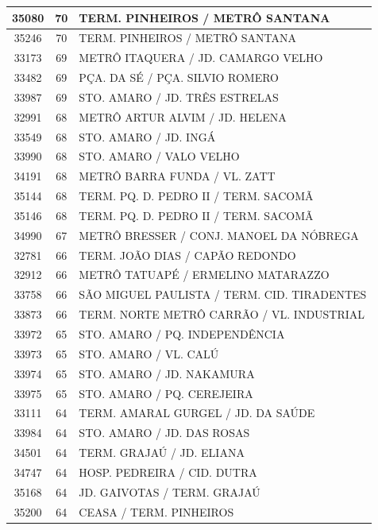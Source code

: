 \documentclass[
	12pt,				%
	oneside,			%
	a4paper,			%
	english,			%
	brazil				%
	]{abntex2ppgsi}
\begin{document}
\begin{apendicesenv}
\begin{longtable}{c|c|p{7cm}}
\hline
    35080 & 70    & TERM. PINHEIROS / METRÔ SANTANA \\
\hline
    35246 & 70    & TERM. PINHEIROS / METRÔ SANTANA \\
\hline
    33173 & 69    & METRÔ ITAQUERA / JD. CAMARGO VELHO \\
\hline
    33482 & 69    & PÇA. DA SÉ / PÇA. SILVIO ROMERO \\
\hline
    33987 & 69    & STO. AMARO / JD. TRÊS ESTRELAS \\
\hline
    32991 & 68    & METRÔ ARTUR ALVIM / JD. HELENA \\
\hline
    33549 & 68    & STO. AMARO / JD. INGÁ \\
\hline
    33990 & 68    & STO. AMARO / VALO VELHO \\
\hline
    34191 & 68    & METRÔ BARRA FUNDA / VL. ZATT \\
\hline
    35144 & 68    & TERM. PQ. D. PEDRO II / TERM. SACOMÃ \\
\hline
    35146 & 68    & TERM. PQ. D. PEDRO II / TERM. SACOMÃ \\
\hline
    34990 & 67    & METRÔ BRESSER / CONJ. MANOEL DA NÓBREGA \\
\hline
    32781 & 66    & TERM. JOÃO DIAS / CAPÃO REDONDO \\
\hline
    32912 & 66    & METRÔ TATUAPÉ / ERMELINO MATARAZZO \\
\hline
    33758 & 66    & SÃO MIGUEL PAULISTA / TERM. CID. TIRADENTES \\
\hline
    33873 & 66    & TERM. NORTE METRÔ CARRÃO / VL. INDUSTRIAL \\
\hline
    33972 & 65    & STO. AMARO / PQ. INDEPENDÊNCIA \\
\hline
    33973 & 65    & STO. AMARO / VL. CALÚ \\
\hline
    33974 & 65    & STO. AMARO / JD. NAKAMURA \\
\hline
    33975 & 65    & STO. AMARO / PQ. CEREJEIRA \\
\hline
    33111 & 64    & TERM. AMARAL GURGEL / JD. DA SAÚDE \\
\hline
    33984 & 64    & STO. AMARO / JD. DAS ROSAS \\
\hline
    34501 & 64    & TERM. GRAJAÚ / JD. ELIANA \\
\hline
    34747 & 64    & HOSP. PEDREIRA / CID. DUTRA \\
\hline
    35168 & 64    & JD. GAIVOTAS / TERM. GRAJAÚ \\
\hline
    35200 & 64    & CEASA / TERM. PINHEIROS \\

\end{longtable}
\end{apendicesenv}
\end{document}
